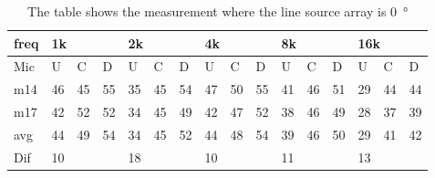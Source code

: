 \begin{table}[H]
\centering
\caption{The table shows the measurement where the line source array is \SI{0}{\degree}}
\begin{tabular}{l|l|l|l|l|l|l|l|l|l|l|l|l|lll}
freq & \multicolumn{3}{l|}{1k} & \multicolumn{3}{l|}{2k} & \multicolumn{3}{l|}{4k} & \multicolumn{3}{l|}{8k} & \multicolumn{3}{l}{16k}                                \\ \hline
Mic  & U      & C      & D     & U      & C      & D     & U      & C      & D     & U      & C      & D     & \multicolumn{1}{l|}{U}  & \multicolumn{1}{l|}{C}  & D  \\ \hline
m14  & 46     & 45     & 55    & 35     & 45     & 54    & 47     & 50     & 55    & 41     & 46     & 51    & \multicolumn{1}{l|}{29} & \multicolumn{1}{l|}{44} & 44 \\
m17  & 42     & 52     & 52    & 34     & 45     & 49    & 42     & 47     & 52    & 38     & 46     & 49    & \multicolumn{1}{l|}{28} & \multicolumn{1}{l|}{37} & 39 \\ \hline
avg  &   44    &   49   & 54    &  34    &  45    &  52  &   44     &  48   &   54  &  39    & 46    &  50     & \multicolumn{1}{l|}{29}   & \multicolumn{1}{l|}{41}   & 42 \\ \hline  
Dif & \multicolumn{3}{l|}{10} & \multicolumn{3}{l|}{18} & \multicolumn{3}{l|}{10} & \multicolumn{3}{l|}{11} & \multicolumn{3}{l}{13}                                
\end{tabular}
\end{table}



